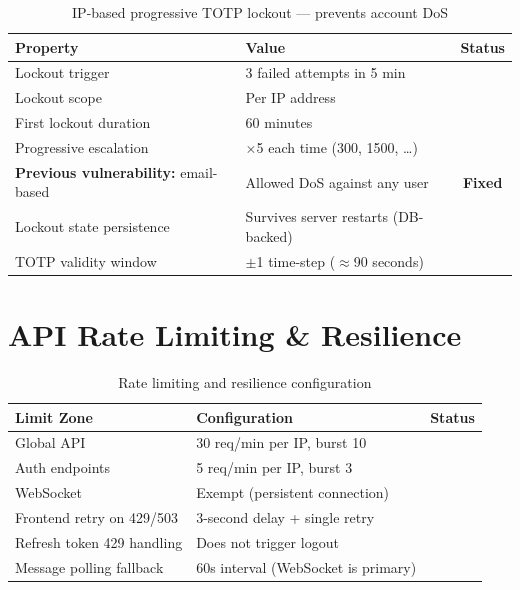 \documentclass[12pt,a4paper]{article}
\newcommand{\pass}{\textcolor{success}{\checkmark}}
\newcommand{\fixd}{\textcolor{fixed}{\textbf{Fixed}}}
\begin{document}
\begin{table}[H]
\centering
\begin{tabular}{llc}
\toprule
\textbf{Property} & \textbf{Value} & \textbf{Status} \\
\midrule
Lockout trigger & 3 failed attempts in 5 min & \pass \\
Lockout scope & Per IP address & \pass \\
First lockout duration & 60 minutes & \pass \\
Progressive escalation & $\times$5 each time (300, 1500, \ldots) & \pass \\
\textbf{Previous vulnerability:} email-based & Allowed DoS against any user & \fixd \\
Lockout state persistence & Survives server restarts (DB-backed) & \pass \\
TOTP validity window & $\pm$1 time-step ($\approx$90 seconds) & \pass \\
\bottomrule
\end{tabular}
\caption{IP-based progressive TOTP lockout --- prevents account DoS}
\end{table}

\section{API Rate Limiting \& Resilience}

\begin{table}[H]
\centering
\begin{tabular}{llc}
\toprule
\textbf{Limit Zone} & \textbf{Configuration} & \textbf{Status} \\
\midrule
Global API & 30 req/min per IP, burst 10 & \pass \\
Auth endpoints & 5 req/min per IP, burst 3 & \pass \\
WebSocket & Exempt (persistent connection) & \pass \\
Frontend retry on 429/503 & 3-second delay + single retry & \pass \\
Refresh token 429 handling & Does not trigger logout & \pass \\
Message polling fallback & 60s interval (WebSocket is primary) & \pass \\
\bottomrule
\end{tabular}
\caption{Rate limiting and resilience configuration}
\end{table}
\end{document}
